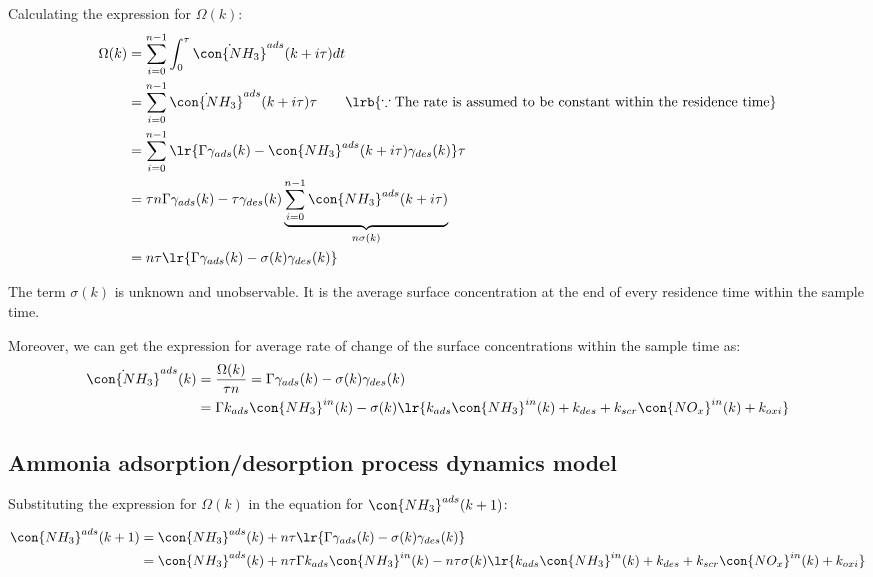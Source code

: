 Calculating the expression for $\Omega(k)$:
\begin{align*}
    \Omega(k) &= \sum_{i=0}^{n-1} \int_{0}^{\tau} \dot{\con{NH_3}}^{ads} (k + i\tau) dt\\
    &= \sum_{i=0}^{n-1} \dot{\con{NH_3}}^{ads} (k + i\tau) \tau \qquad \lrb{\because \text{The rate is assumed to be constant within the residence time}}\\
    &= \sum_{i=0}^{n-1} \lr{\Gamma \gamma_{ads} (k) - \con{NH_3}^{ads} (k + i \tau) \gamma_{des} (k)} \tau\\
    &= \tau n \Gamma \gamma_{ads} (k) - \tau \gamma_{des} (k) \underbrace{\sum_{i=0}^{n-1} \con{NH_3}^{ads} (k + i \tau) }_{n \sigma(k)} \\
    &= n \tau \lr{\Gamma \gamma_{ads} (k) - \sigma(k) \gamma_{des} (k)}
\end{align*}

The term $\sigma(k)$ is unknown and unobservable. It is the average surface
concentration at the end of every residence time within the sample time.

Moreover, we can get the expression for average rate of change of the surface
concentrations within the sample time as:
\begin{align*}
    \dot{\con{NH_3}}^{ads} (k) &= \frac{\Omega(k)}{\tau n} = \Gamma \gamma_{ads} (k) - \sigma(k) \gamma_{des} (k)\\
    &= \Gamma k_{ads} \con{NH_3}^{in}(k) - \sigma(k) \lr{k_{ads} \con{NH_3}^{in}(k) + k_{des} + k_{scr} \con{NO_x}^{in}(k) + k_{oxi}}
\end{align*}


\subsection{Ammonia adsorption/desorption process dynamics model}
Substituting the expression for $\Omega(k)$ in the equation for
$\con{NH_3}^{ads}(k + 1)$:

\begin{align*}
    \con{NH_3}^{ads}(k + 1) &= \con{NH_3}^{ads} (k) + n \tau \lr{\Gamma \gamma_{ads} (k) - \sigma(k) \gamma_{des} (k)}\\
    &= \con{NH_3}^{ads}(k) + n \tau \Gamma k_{ads} \con{NH_3}^{in}(k) - n \tau \sigma(k) \lr{k_{ads} \con{NH_3}^{in}(k) + k_{des} + k_{scr} \con{NO_x}^{in}(k) + k_{oxi}}
\end{align*}


